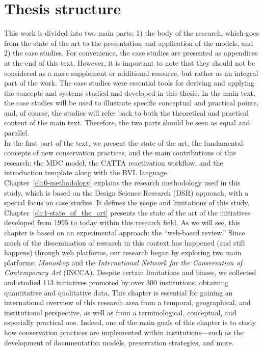 \section*{Thesis structure}
This work is divided into two main parts: 1) the body of the research, which goes from the state of the art to the presentation and application of the models, and 2) the case studies. For convenience, the case studies are presented as appendices at the end of this text. However, it is important to note that they should not be considered as a mere supplement or additional resource, but rather as an integral part of the work. The case studies were essential tools for deriving and applying the concepts and systems studied and developed in this thesis. In the main text, the case studies will be used to illustrate specific conceptual and practical points, and, of course, the studies will refer back to both the theoretical and practical content of the main text. Therefore, the two parts should be seen as equal and parallel.\\
\newline
In the first part of the text, we present the state of the art, the fundamental concepts of new conservation practices, and the main contributions of this research: the MDC model, the CATTA reactivation workflow, and the introduction template along with the BVL language.\\
Chapter~\ref{ch:0-methodology} explains the research methodology used in this study, which is based on the Design Science Research (DSR) approach, with a special focus on case studies. It defines the scope and limitations of this study.\\
Chapter~\ref{ch:1-state_of_the_art} presents the state of the art of the initiatives developed from 1995 to today within this research field. As we will see, this chapter is based on an experimental approach: the ``web-based review.'' Since much of the dissemination of research in this context has happened (and still happens) through web platforms, our research began by exploring two main platforms: \textit{Monoskop} and the \textit{International Network for the Conservation of Contemporary Art} (INCCA). Despite certain limitations and biases, we collected and studied 113 initiatives promoted by over 300 institutions, obtaining quantitative and qualitative data. This chapter is essential for gaining an international overview of this research area from a temporal, geographical, and institutional perspective, as well as from a terminological, conceptual, and especially practical one. Indeed, one of the main goals of this chapter is to study how conservation practices are implemented within institutions—such as the development of documentation models, preservation strategies, and more.\\

